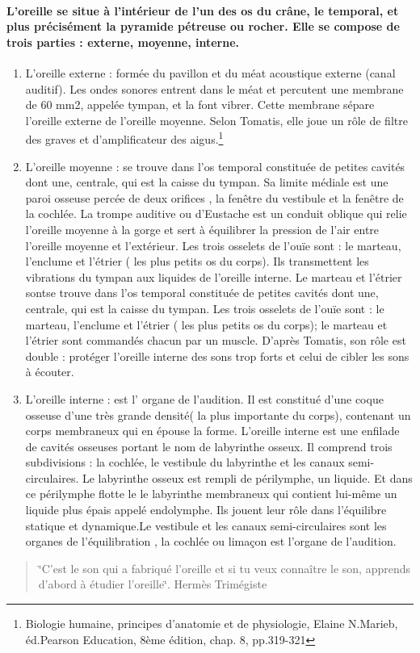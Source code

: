 \paragraph{L'oreille se situe à l'intérieur de l'un des os du crâne, le temporal,
et plus précisément la pyramide pétreuse ou rocher. Elle se compose
de trois parties : externe, moyenne, interne.}
\begin{enumerate}
\item L'oreille externe : formée du pavillon et du méat acoustique externe
(canal auditif). Les ondes sonores entrent dans le méat et percutent
une membrane de 60 mm2, appelée tympan, et la font vibrer. Cette membrane
sépare l'oreille externe de l'oreille moyenne. Selon Tomatis, elle
joue un rôle de filtre des graves et d'amplificateur des aigus.\footnote{Biologie humaine, principes d'anatomie et de physiologie, Elaine N.Marieb,
éd.Pearson Education, 8ème édition, chap. 8, pp.319-321}
\item L'oreille moyenne : se trouve dans l'os temporal constituée de petites
cavités dont une, centrale, qui est la caisse du tympan. Sa limite
médiale est une paroi osseuse percée de deux orifices , la fenêtre
du vestibule et la fenêtre de la cochlée. La trompe auditive ou d'Eustache
est un conduit oblique qui relie l'oreille moyenne à la gorge et sert
à équilibrer la pression de l'air entre l'oreille moyenne et l'extérieur.
Les trois osselets de l'ouïe sont : le marteau, l'enclume et l'étrier
( les plus petits os du corps). Ils transmettent les vibrations du
tympan aux liquides de l'oreille interne. Le marteau et l'étrier sontse
trouve dans l'os temporal constituée de petites cavités dont une,
centrale, qui est la caisse du tympan. Les trois osselets de l'ouïe
sont : le marteau, l'enclume et l'étrier ( les plus petits os du corps);
le marteau et l'étrier sont commandés chacun par un muscle. D'après
Tomatis, son rôle est double : protéger l'oreille interne des sons
trop forts et celui de cibler les sons à écouter.
\item L'oreille interne : est l' organe de l\textquoteright audition. Il
est constitué d'une coque osseuse d'une très grande densité( la plus
importante du corps), contenant un corps membraneux qui en épouse
la forme. L'oreille interne est une enfilade de cavités osseuses portant
le nom de labyrinthe osseux. Il comprend trois subdivisions : la cochlée,
le vestibule du labyrinthe et les canaux semi-circulaires. Le labyrinthe
osseux est rempli de périlymphe, un liquide. Et dans ce périlymphe
flotte le le labyrinthe membraneux qui contient lui-même un liquide
plus épais appelé endolymphe. Ils jouent leur rôle dans l'équilibre
statique et dynamique.Le vestibule et les canaux semi-circulaires
sont les organes de l\textquoteright équilibration , la cochlée ou
limaçon est l'organe de l'audition. 
\end{enumerate}
\begin{quotation}
\char`\"{}C'est le son qui a fabriqué l'oreille et si tu veux connaître
le son, apprends d'abord à étudier l\textquoteright oreille\char`\"{}.
Hermès Trimégiste
\end{quotation}

